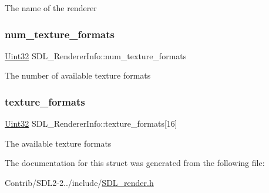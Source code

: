 The name of the renderer \mbox{\label{struct_s_d_l___renderer_info_acdec165b2053b914313f5996983ec6b8}} 
\subsubsection{\texorpdfstring{num\+\_\+texture\+\_\+formats}{num\_texture\_formats}}
{\footnotesize\ttfamily \mbox{\hyperlink{_s_d_l__stdinc_8h_add440eff171ea5f55cb00c4a9ab8672d}{Uint32}} S\+D\+L\+\_\+\+Renderer\+Info\+::num\+\_\+texture\+\_\+formats}

The number of available texture formats \mbox{\label{struct_s_d_l___renderer_info_a88450f9d48e593ec4571e3ba7cc3427d}} 
\subsubsection{\texorpdfstring{texture\+\_\+formats}{texture\_formats}}
{\footnotesize\ttfamily \mbox{\hyperlink{_s_d_l__stdinc_8h_add440eff171ea5f55cb00c4a9ab8672d}{Uint32}} S\+D\+L\+\_\+\+Renderer\+Info\+::texture\+\_\+formats\mbox{[}16\mbox{]}}

The available texture formats 

The documentation for this struct was generated from the following file\+:\begin{DoxyCompactItemize}
\item 
Contrib/\+S\+D\+L2-\/2../include/\mbox{\hyperlink{_s_d_l__render_8h}{S\+D\+L\+\_\+render.\+h}}\end{DoxyCompactItemize}
